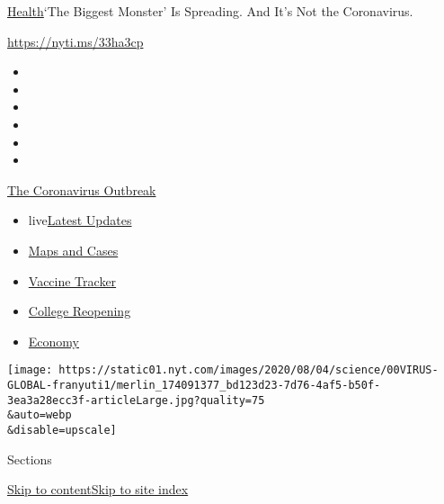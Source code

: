 \href{/section/health}{Health}\textbar{}`The Biggest Monster' Is
Spreading. And It's Not the Coronavirus.

\url{https://nyti.ms/33ha3cp}

\begin{itemize}
\item
\item
\item
\item
\item
\item
\end{itemize}

\href{https://www.nytimes.com/news-event/coronavirus?action=click\&pgtype=Article\&state=default\&region=TOP_BANNER\&context=storylines_menu}{The
Coronavirus Outbreak}

\begin{itemize}
\tightlist
\item
  live\href{https://www.nytimes.com/2020/08/03/world/coronavirus-covid-19.html?action=click\&pgtype=Article\&state=default\&region=TOP_BANNER\&context=storylines_menu}{Latest
  Updates}
\item
  \href{https://www.nytimes.com/interactive/2020/us/coronavirus-us-cases.html?action=click\&pgtype=Article\&state=default\&region=TOP_BANNER\&context=storylines_menu}{Maps
  and Cases}
\item
  \href{https://www.nytimes.com/interactive/2020/science/coronavirus-vaccine-tracker.html?action=click\&pgtype=Article\&state=default\&region=TOP_BANNER\&context=storylines_menu}{Vaccine
  Tracker}
\item
  \href{https://www.nytimes.com/2020/08/02/us/covid-college-reopening.html?action=click\&pgtype=Article\&state=default\&region=TOP_BANNER\&context=storylines_menu}{College
  Reopening}
\item
  \href{https://www.nytimes.com/live/2020/08/03/business/stock-market-today-coronavirus?action=click\&pgtype=Article\&state=default\&region=TOP_BANNER\&context=storylines_menu}{Economy}
\end{itemize}

\texttt{[image: https://static01.nyt.com/images/2020/08/04/science/00VIRUS-GLOBAL-franyuti1/merlin\_174091377\_bd123d23-7d76-4af5-b50f-3ea3a28ecc3f-articleLarge.jpg?quality=75\\\&auto=webp\\\&disable=upscale]}

Sections

\protect\hyperlink{site-content}{Skip to
content}\protect\hyperlink{site-index}{Skip to site index}

